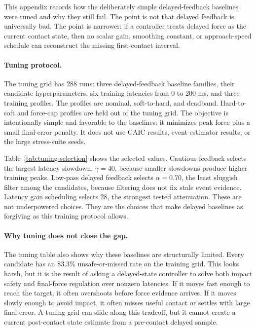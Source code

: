 \documentclass{article}
\newcommand{\caic}{CAIC}
\begin{document}
This appendix records how the deliberately simple delayed-feedback baselines were tuned and why they still fail. The point is not that delayed feedback is universally bad. The point is narrower: if a controller treats delayed force as the current contact state, then no scalar gain, smoothing constant, or approach-speed schedule can reconstruct the missing first-contact interval.

\begin{table}[t]
    \centering
    \scriptsize
    \caption{Training-grid selection for the three tunable delayed-feedback baselines. Score is mean peak force plus 0.25 times mean final-force error on the tuning grid. Unsafe/miss counts peak force above 12 N or no-contact outcomes.}
    \label{tab:tuning-selection}
    \resizebox{\linewidth}{!}{}
\end{table}

\paragraph{Tuning protocol.}
The tuning grid has 288 runs: three delayed-feedback baseline families, their candidate hyperparameters, six training latencies from 0 to 200 ms, and three training profiles. The profiles are nominal, soft-to-hard, and deadband. Hard-to-soft and force-cap profiles are held out of the tuning grid. The objective is intentionally simple and favorable to the baselines: it minimizes peak force plus a small final-error penalty. It does not use \caic{} results, event-estimator results, or the large stress-suite seeds.

Table~\ref{tab:tuning-selection} shows the selected values. Cautious feedback selects the largest latency slowdown, $\gamma=40$, because smaller slowdowns produce higher training peaks. Low-pass delayed feedback selects $\alpha=0.70$, the least sluggish filter among the candidates, because filtering does not fix stale event evidence. Latency gain scheduling selects 28, the strongest tested attenuation. These are not underpowered choices. They are the choices that make delayed baselines as forgiving as this training protocol allows.

\paragraph{Why tuning does not close the gap.}
The tuning table also shows why these baselines are structurally limited. Every candidate has an 83.3\% unsafe-or-missed rate on the training grid. This looks harsh, but it is the result of asking a delayed-state controller to solve both impact safety and final-force regulation over nonzero latencies. If it moves fast enough to reach the target, it often overshoots before force evidence arrives. If it moves slowly enough to avoid impact, it often misses useful contact or settles with large final error. A tuning grid can slide along this tradeoff, but it cannot create a current post-contact state estimate from a pre-contact delayed sample.
\end{document}
